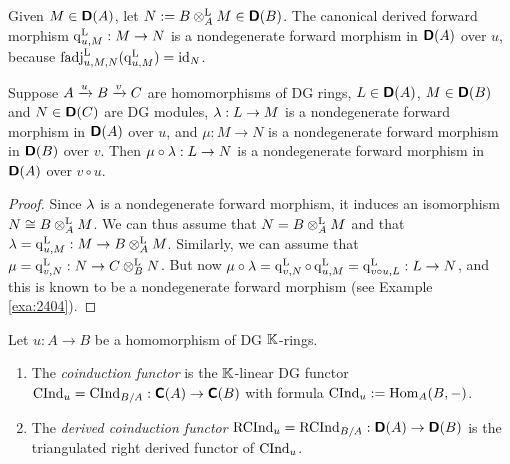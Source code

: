 \begin{exa} \label{exa:2404}
Given $M \in \boldsymbol{\mathsf{D}}(A)$, let $N := B \otimes^{\mathrm{L}}_A M \in \boldsymbol{\mathsf{D}}(B)$. 
The canonical derived forward morphism%
%
$\operatorname{q}_{u, M}^{\mathrm{L}} : M \to N$ is a nondegenerate forward morphism
in $\boldsymbol{\mathsf{D}}(A)$ over $u$, because 
$\operatorname{fadj}_{u, M, N}^{\mathrm{L}}(\operatorname{q}_{u, M}^{\mathrm{L}}) = \operatorname{id}_N$.
\end{exa}

\begin{prop} \label{prop:3191}
Suppose $A \xrightarrow{u} B \xrightarrow{v} C$ are homomorphisms of DG rings,
$L \in \boldsymbol{\mathsf{D}}(A)$, $M \in \boldsymbol{\mathsf{D}}(B)$ and $N \in \boldsymbol{\mathsf{D}}(C)$ are DG 
modules, $\lambda : L \to M$ is a nondegenerate forward morphism
in $\boldsymbol{\mathsf{D}}(A)$ over $u$, and $\mu : M \to N$ is a nondegenerate forward 
morphism in $\boldsymbol{\mathsf{D}}(B)$ over $v$. Then 
$\mu \circ \lambda : L \to  N$
is a nondegenerate forward morphism in $\boldsymbol{\mathsf{D}}(A)$ over $v \circ u$.
\end{prop}

\begin{proof}
Since $\lambda$ is a nondegenerate forward morphism, it induces an isomorphism 
$N \cong B \otimes^{\mathrm{L}}_A M$. We can thus assume that  
$N = B \otimes^{\mathrm{L}}_A M$ and that 
$\lambda = \operatorname{q}_{u, M}^{\mathrm{L}} : M \to B \otimes^{\mathrm{L}}_A M$.
Similarly, we can assume that 
$\mu = \operatorname{q}_{v, N}^{\mathrm{L}} : N \to C \otimes^{\mathrm{L}}_B N$.
But now 
$\mu \circ \lambda  = \operatorname{q}_{v, N}^{\mathrm{L}} \circ \operatorname{q}_{u, M}^{\mathrm{L}} = 
\operatorname{q}_{v \circ u, L}^{\mathrm{L}} : L \to N$,
and this is known to be a nondegenerate forward morphism (see Example 
\ref{exa:2404}). 
\end{proof}

\begin{dfn} \label{dfn:3095}
Let $u : A \to B$ be a homomorphism of DG $\mathbb{K}$-rings.
\begin{enumerate}
\item The {\em coinduction functor}%
%
is the $\mathbb{K}$-linear DG functor 
$\operatorname{CInd}_u = \operatorname{CInd}_{B / A} : \boldsymbol{\mathsf{C}}(A) \to \boldsymbol{\mathsf{C}}(B)$ 
with formula
$\operatorname{CInd}_u := \operatorname{Hom}_{A}(B, -)$.

\item The  {\em derived coinduction functor}%
% 
$\operatorname{RCInd}_u = \operatorname{RCInd}_{B / A} : \boldsymbol{\mathsf{D}}(A) \to \boldsymbol{\mathsf{D}}(B)$  
is the triangulated right derived functor of $\operatorname{CInd}_u$.
\end{enumerate}
\end{dfn}

